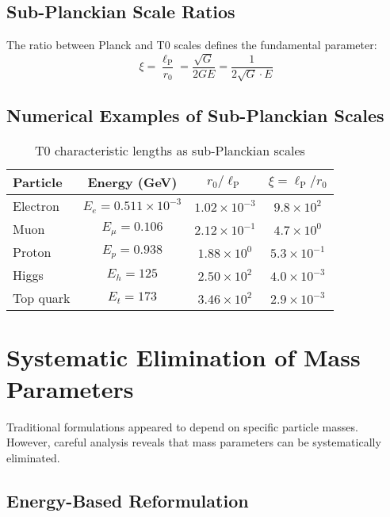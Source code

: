 \documentclass[12pt,a4paper]{report}
\newcommand{\lP}{\ell_{\text{P}}}         %
\newcommand{\rzero}{r_0}                  %
\begin{document}
	\subsection{Sub-Planckian Scale Ratios}
	\label{subsec:sub_planckian_ratios}
	
	The ratio between Planck and T0 scales defines the fundamental parameter:
	\begin{equation}
		\xi = \frac{\lP}{\rzero} = \frac{\sqrt{G}}{2GE} = \frac{1}{2\sqrt{G} \cdot E}
	\end{equation}
	
	\subsection{Numerical Examples of Sub-Planckian Scales}
	\label{subsec:numerical_sub_planckian}
	
	\begin{table}[htbp]
		\centering
		\begin{tabular}{lccc}
			\toprule
			\textbf{Particle} & \textbf{Energy (GeV)} & \textbf{$\rzero/\lP$} & \textbf{$\xi = \lP/\rzero$} \\
			\midrule
			Electron & $E_e = 0.511 \times 10^{-3}$ & $1.02 \times 10^{-3}$ & $9.8 \times 10^{2}$ \\
			Muon & $E_\mu = 0.106$ & $2.12 \times 10^{-1}$ & $4.7 \times 10^{0}$ \\
			Proton & $E_p = 0.938$ & $1.88 \times 10^{0}$ & $5.3 \times 10^{-1}$ \\
			Higgs & $E_h = 125$ & $2.50 \times 10^{2}$ & $4.0 \times 10^{-3}$ \\
			Top quark & $E_t = 173$ & $3.46 \times 10^{2}$ & $2.9 \times 10^{-3}$ \\
			\bottomrule
		\end{tabular}
		\caption{T0 characteristic lengths as sub-Planckian scales}
		\label{tab:sub_planckian_scales}
	\end{table}
	
	\section{Systematic Elimination of Mass Parameters}
	\label{sec:mass_elimination}
	
	Traditional formulations appeared to depend on specific particle masses. However, careful analysis reveals that mass parameters can be systematically eliminated.
	
	\subsection{Energy-Based Reformulation}
	\label{subsec:energy_based_reformulation}
	
\end{document}
